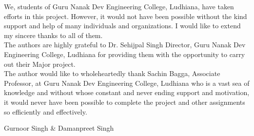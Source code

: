 \begin{Large}
\end{Large}

\noindent We, students of Guru Nanak Dev Engineering College, Ludhiana, have taken efforts in this project.
However, it would not have been possible without the kind support and help of many individuals
and organizations. I would like to extend my sincere thanks to all of them.\\

\noindent The authors are highly grateful to Dr. Sehijpal Singh Director, Guru Nanak Dev Engineering College, Ludhiana for providing them with the opportunity to carry out their Major project.\\

\noindent The author would like to wholeheartedly thank Sachin Bagga, Associate Professor, at Guru Nanak Dev Engineering College, Ludhiana who is a vast sea of knowledge and
without whose constant and never ending support and motivation, it would never have been
possible to complete the project and other assignments so efficiently and effectively.

\vskip 1.0cm 
\noindent Gurnoor Singh \& Damanpreet Singh
